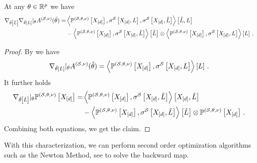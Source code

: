 \begin{lemma}
    \label{lem:hesseCumfunction}
    At any $\theta\in\mathbb{R}^{p}$ we have
    \begin{align*}
        \nabla_{\tilde{\theta}\left[\tilde{L}\right]}\nabla_{\tilde{\theta}\left[L\right]}|_{\theta} A^{(\mathcal{S},\nu)}(\tilde{\theta})
        =& \left\langle \mathbb{P}^{(\mathcal{S},\theta,\nu)}\left[X_{[d]}\right],\sigma^{\mathcal{S}}\left[X_{[d]},L\right],\sigma^{\mathcal{S}}\left[X_{[d]},\tilde{L}\right]\right\rangle \left[ \tilde{L},L \right] \\
        &-  \left\langle \mathbb{P}^{(\mathcal{S},\theta,\nu)}\left[X_{[d]}\right],\sigma^{\mathcal{S}}\left[X_{[d]},\tilde{L}\right]\right\rangle \left[ \tilde{L} \right] \otimes \left\langle \mathbb{P}^{(\mathcal{S},\theta,\nu)}\left[X_{[d]}\right],\sigma^{\mathcal{S}}\left[X_{[d]},L\right]\right\rangle \left[ L \right] \, .
    \end{align*}
\end{lemma}
\begin{proof}
    By  we have
    \begin{align*}
        \nabla_{\tilde{\theta}\left[L\right]}|_{\theta} A^{(\mathcal{S},\nu)}(\tilde{\theta})
        = \left\langle \mathbb{P}^{(\mathcal{S},\theta,\nu)}\left[X_{[d]}\right],\sigma^{\mathcal{S}}\left[X_{[d]},L\right]\right\rangle \left[ L \right] \, .
    \end{align*}
    It further holds
    \begin{align*}
        \nabla_{\tilde{\theta}\left[\tilde{L}\right]}|_{\theta} \mathbb{P}^{(\mathcal{S},\theta,\nu)}\left[X_{[d]}\right]
        = & \left\langle \mathbb{P}^{(\mathcal{S},\theta,\nu)}\left[X_{[d]}\right],\sigma^{\mathcal{S}}\left[X_{[d]},\tilde{L}\right]\right\rangle \left[ X_{[d]},\tilde{L} \right] \\
        & - \left\langle \mathbb{P}^{(\mathcal{S},\theta,\nu)}\left[X_{[d]}\right],\sigma^{\mathcal{S}}\left[X_{[d]},\tilde{L}\right]\right\rangle \left[ \tilde{L} \right] \otimes \mathbb{P}^{(\mathcal{S},\theta,\nu)}\left[X_{[d]}\right] \, .
    \end{align*}
    Combining both equations, we get the claim.
\end{proof}

With this characterization, we can perform second order optimization algorithms such as the Newton Method, see  to solve the backward map.

